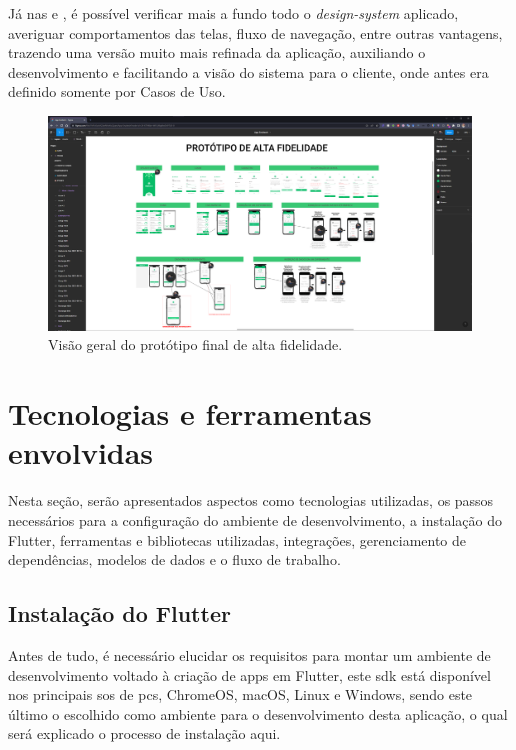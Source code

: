Já nas  e , é possível verificar mais a fundo todo o \textit{design-system} aplicado, averiguar comportamentos das telas, fluxo de navegação, entre outras vantagens, trazendo uma versão muito mais refinada da aplicação, auxiliando o desenvolvimento e facilitando a visão do sistema para o cliente, onde antes era definido somente por Casos de Uso.

\begin{figure}[H]
\centering
  \includegraphics[width=\columnwidth]{images/prototipo_alta.png}
  \caption{Visão geral do protótipo final de alta fidelidade.}
  \label{fig:prototipo_alta}
\end{figure}


\section{Tecnologias e ferramentas envolvidas}\label{sec:detalhes_tec}
Nesta seção, serão apresentados aspectos como tecnologias utilizadas, os passos necessários para a configuração do ambiente de desenvolvimento, a instalação do Flutter, ferramentas e bibliotecas utilizadas, integrações, gerenciamento de dependências, modelos de dados e o fluxo de trabalho.

\subsection{Instalação do Flutter}\label{ssec:instalacao_flutter}
Antes de tudo, é necessário elucidar os requisitos para montar um ambiente de desenvolvimento voltado à criação de \acp{app} em Flutter, este \ac{sdk} está disponível nos principais \acp{so} de \acp{pc}, ChromeOS, macOS, Linux e Windows, sendo este último o escolhido como ambiente para o desenvolvimento desta aplicação, o qual será explicado o processo de instalação aqui.

